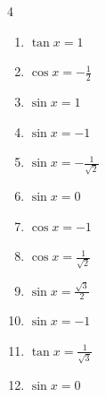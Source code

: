 \begin{multicols}{4}
\begin{enumerate}

  \item $\displaystyle \tan{x}  = 1$


  \item $\displaystyle \cos{x}  = -\frac{1}{2}$


  \item $\displaystyle \sin{x}  = 1$


  \item $\displaystyle \sin{x}  = -1$


  \item $\displaystyle \sin{x}  = -\frac{1}{\sqrt{2}}$


  \item $\displaystyle \sin{x}  = 0$


  \item $\displaystyle \cos{x}  = -1$


  \item $\displaystyle \cos{x}  = \frac{1}{\sqrt{2}}$


  \item $\displaystyle \sin{x}  = \frac{\sqrt{3}}{2}$


  \item $\displaystyle \sin{x}  = -1$


  \item $\displaystyle \tan{x}  = \frac{1}{\sqrt{3}}$


  \item $\displaystyle \sin{x}  = 0$


\end{enumerate}
\end{multicols}
